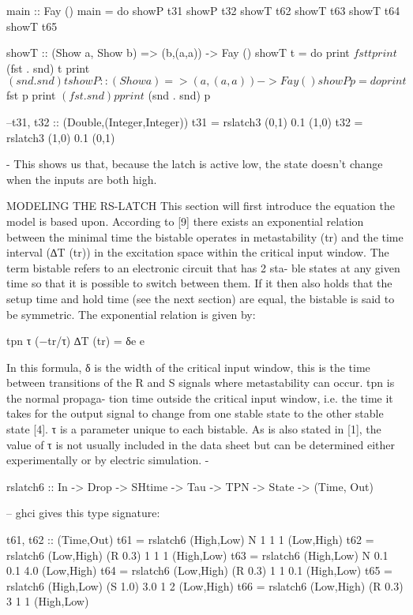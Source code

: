 main :: Fay ()
main = do
  showP t31
  showP t32
  showT t62
  showT t63
  showT t64
  showT t65

showT :: (Show a, Show b) => (b,(a,a)) -> Fay ()
showT t = do
          print $ fst t
          print $ (fst . snd) t
          print $ (snd . snd) t

showP :: (Show a) => (a,(a,a)) -> Fay ()
showP p = do
          print $ fst p
          print $ (fst . snd) p
          print $ (snd . snd) p
          
--t31, t32 :: (Double,(Integer,Integer))
t31 = rslatch3 (0,1) 0.1 (1,0)
t32 = rslatch3 (1,0) 0.1 (0,1)
  
{-
This shows us that, because the latch is active low, the
state doesn’t change when the inputs are both high.

MODELING THE RS-LATCH
This section will first introduce the equation the model is
based upon. According to [9] there exists an exponential
relation between the minimal time the bistable operates
in metastability (tr) and the time interval (∆T (tr)) in the
excitation space within the critical input window. The
term bistable refers to an electronic circuit that has 2 sta-
ble states at any given time so that it is possible to switch
between them. If it then also holds that the setup time
and hold time (see the next section) are equal, the bistable
is said to be symmetric. The exponential relation is given
by:

  tpn τ \exp(−tr/τ) ∆T (tr) = δe e

In this formula, δ is the width of the critical input window,
this is the time between transitions of the R and S signals
where metastability can occur. tpn is the normal propaga-
tion time outside the critical input window, i.e. the time it
takes for the output signal to change from one stable state
to the other stable state [4]. τ is a parameter unique to
each bistable. As is also stated in [1], the value of τ is not
usually included in the data sheet but can be determined
either experimentally or by electric simulation.
-}

rslatch6 :: In -> Drop -> SHtime -> Tau -> TPN -> State -> (Time, Out)

-- ghci gives this type signature:

t61, t62 :: (Time,Out)
t61 = rslatch6 (High,Low) N 1 1 1 (Low,High)
t62 = rslatch6  (Low,High) (R 0.3) 1 1 1 (High,Low)
t63 = rslatch6 (High,Low) N 0.1 0.1 4.0 (Low,High)
t64 = rslatch6  (Low,High) (R 0.3) 1 1 0.1 (High,Low)
t65 = rslatch6 (High,Low) (S 1.0) 3.0 1 2 (Low,High)
t66 = rslatch6  (Low,High) (R 0.3) 3 1 1 (High,Low)

